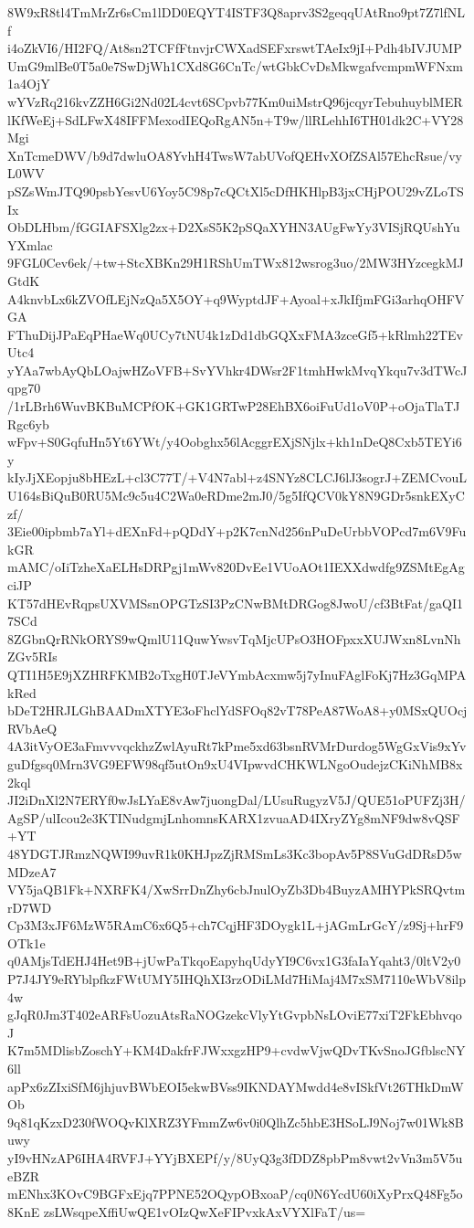 8W9xR8tl4TmMrZr6sCm1lDD0EQYT4ISTF3Q8aprv3S2geqqUAtRno9pt7Z7lfNLf
i4oZkVI6/HI2FQ/At8sn2TCFfFtnvjrCWXadSEFxrswtTAeIx9jI+Pdh4bIVJUMP
UmG9mlBe0T5a0e7SwDjWh1CXd8G6CnTc/wtGbkCvDsMkwgafvcmpmWFNxm1a4OjY
wYVzRq216kvZZH6Gi2Nd02L4cvt6SCpvb77Km0uiMstrQ96jcqyrTebuhuyblMER
lKfWeEj+SdLFwX48IFFMexodIEQoRgAN5n+T9w/llRLehhI6TH01dk2C+VY28Mgi
XnTcmeDWV/b9d7dwluOA8YvhH4TwsW7abUVofQEHvXOfZSAl57EhcRsue/vyL0WV
pSZsWmJTQ90psbYesvU6Yoy5C98p7cQCtXl5cDfHKHlpB3jxCHjPOU29vZLoTSIx
ObDLHbm/fGGIAFSXlg2zx+D2XsS5K2pSQaXYHN3AUgFwYy3VISjRQUshYuYXmlac
9FGL0Cev6ek/+tw+StcXBKn29H1RShUmTWx812wsrog3uo/2MW3HYzcegkMJGtdK
A4knvbLx6kZVOfLEjNzQa5X5OY+q9WyptdJF+Ayoal+xJkIfjmFGi3arhqOHFVGA
FThuDijJPaEqPHaeWq0UCy7tNU4k1zDd1dbGQXxFMA3zceGf5+kRlmh22TEvUtc4
yYAa7wbAyQbLOajwHZoVFB+SvYVhkr4DWsr2F1tmhHwkMvqYkqu7v3dTWcJqpg70
/1rLBrh6WuvBKBuMCPfOK+GK1GRTwP28EhBX6oiFuUd1oV0P+oOjaTlaTJRgc6yb
wFpv+S0GqfuHn5Yt6YWt/y4Oobghx56lAcggrEXjSNjlx+kh1nDeQ8Cxb5TEYi6y
kIyJjXEopju8bHEzL+cl3C77T/+V4N7abl+z4SNYz8CLCJ6lJ3sogrJ+ZEMCvouL
U164sBiQuB0RU5Mc9c5u4C2Wa0eRDme2mJ0/5g5IfQCV0kY8N9GDr5snkEXyCzf/
3Eie00ipbmb7aYl+dEXnFd+pQDdY+p2K7cnNd256nPuDeUrbbVOPcd7m6V9FukGR
mAMC/oIiTzheXaELHsDRPgj1mWv820DvEe1VUoAOt1IEXXdwdfg9ZSMtEgAgciJP
KT57dHEvRqpsUXVMSsnOPGTzSI3PzCNwBMtDRGog8JwoU/cf3BtFat/gaQI17SCd
8ZGbnQrRNkORYS9wQmlU11QuwYwsvTqMjcUPsO3HOFpxxXUJWxn8LvnNhZGv5RIs
QTI1H5E9jXZHRFKMB2oTxgH0TJeVYmbAcxmw5j7yInuFAglFoKj7Hz3GqMPAkRed
bDeT2HRJLGhBAADmXTYE3oFhclYdSFOq82vT78PeA87WoA8+y0MSxQUOcjRVbAeQ
4A3itVyOE3aFmvvvqckhzZwlAyuRt7kPme5xd63bsnRVMrDurdog5WgGxVis9xYv
guDfgsq0Mrn3VG9EFW98qf5utOn9xU4VIpwvdCHKWLNgoOudejzCKiNhMB8x2kql
JI2iDnXl2N7ERYf0wJsLYaE8vAw7juongDal/LUsuRugyzV5J/QUE51oPUFZj3H/
AgSP/ulIcou2e3KTINudgmjLnhomnsKARX1zvuaAD4IXryZYg8mNF9dw8vQSF+YT
48YDGTJRmzNQWI99uvR1k0KHJpzZjRMSmLs3Kc3bopAv5P8SVuGdDRsD5wMDzeA7
VY5jaQB1Fk+NXRFK4/XwSrrDnZhy6cbJnulOyZb3Db4BuyzAMHYPkSRQvtmrD7WD
Cp3M3xJF6MzW5RAmC6x6Q5+ch7CqjHF3DOygk1L+jAGmLrGcY/z9Sj+hrF9OTk1e
q0AMjsTdEHJ4Het9B+jUwPaTkqoEapyhqUdyYI9C6vx1G3faIaYqaht3/0ltV2y0
P7J4JY9eRYblpfkzFWtUMY5IHQhXI3rzODiLMd7HiMaj4M7xSM7110eWbV8ilp4w
gJqR0Jm3T402eARFsUozuAtsRaNOGzekcVlyYtGvpbNsLOviE77xiT2FkEbhvqoJ
K7m5MDlisbZoschY+KM4DakfrFJWxxgzHP9+cvdwVjwQDvTKvSnoJGfblscNY6ll
apPx6zZIxiSfM6jhjuvBWbEOI5ekwBVss9IKNDAYMwdd4e8vISkfVt26THkDmWOb
9q81qKzxD230fWOQvKlXRZ3YFmmZw6v0i0QlhZc5hbE3HSoLJ9Noj7w01Wk8Buwy
yI9vHNzAP6IHA4RVFJ+YYjBXEPf/y/8UyQ3g3fDDZ8pbPm8vwt2vVn3m5V5ueBZR
mENhx3KOvC9BGFxEjq7PPNE52OQypOBxoaP/cq0N6YcdU60iXyPrxQ48Fg5o8KnE
zsLWsqpeXffiUwQE1vOIzQwXeFIPvxkAxVYXlFaT/us=
